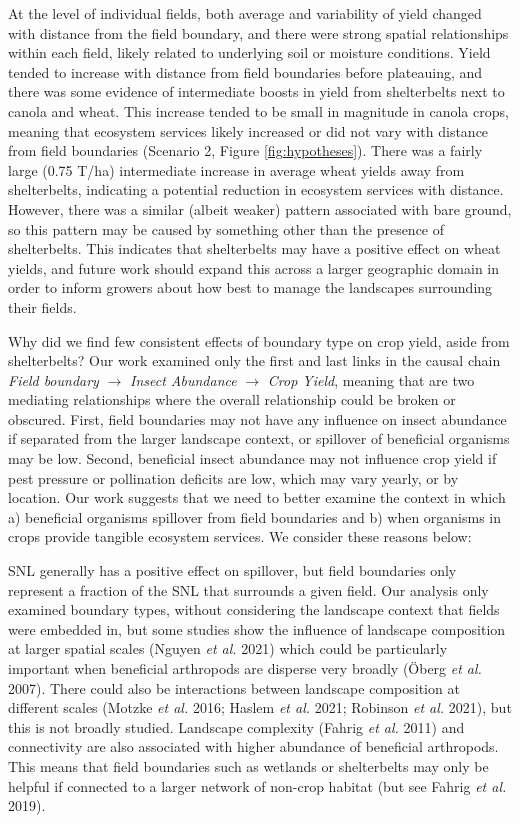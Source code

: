 \documentclass[]{elsarticle} %
\begin{document}
At the level of individual fields, both average and variability of yield changed with distance from the field boundary, and there were strong spatial relationships within each field, likely related to underlying soil or moisture conditions.
Yield tended to increase with distance from field boundaries before plateauing, and there was some evidence of intermediate boosts in yield from shelterbelts next to canola and wheat.
This increase tended to be small in magnitude in canola crops, meaning that ecosystem services likely increased or did not vary with distance from field boundaries (Scenario 2, Figure \ref{fig:hypotheses}).
There was a fairly large (0.75 T/ha) intermediate increase in average wheat yields away from shelterbelts, indicating a potential reduction in ecosystem services with distance.
However, there was a similar (albeit weaker) pattern associated with bare ground, so this pattern may be caused by something other than the presence of shelterbelts.
This indicates that shelterbelts may have a positive effect on wheat yields, and future work should expand this across a larger geographic domain in order to inform growers about how best to manage the landscapes surrounding their fields.

Why did we find few consistent effects of boundary type on crop yield, aside from shelterbelts?
Our work examined only the first and last links in the causal chain \emph{Field boundary} \(\rightarrow\) \emph{Insect Abundance} \(\rightarrow\) \emph{Crop Yield}, meaning that are two mediating relationships where the overall relationship could be broken or obscured.
First, field boundaries may not have any influence on insect abundance if separated from the larger landscape context, or spillover of beneficial organisms may be low.
Second, beneficial insect abundance may not influence crop yield if pest pressure or pollination deficits are low, which may vary yearly, or by location.
Our work suggests that we need to better examine the context in which a) beneficial organisms spillover from field boundaries and b) when organisms in crops provide tangible ecosystem services.
We consider these reasons below:

SNL generally has a positive effect on spillover, but field boundaries only represent a fraction of the SNL that surrounds a given field.
Our analysis only examined boundary types, without considering the landscape context that fields were embedded in, but some studies show the influence of landscape composition at larger spatial scales (Nguyen \emph{et al.} 2021) which could be particularly important when beneficial arthropods are disperse very broadly (Öberg \emph{et al.} 2007).
There could also be interactions between landscape composition at different scales (Motzke \emph{et al.} 2016; Haslem \emph{et al.} 2021; Robinson \emph{et al.} 2021), but this is not broadly studied.
Landscape complexity (Fahrig \emph{et al.} 2011) and connectivity are also associated with higher abundance of beneficial arthropods.
This means that field boundaries such as wetlands or shelterbelts may only be helpful if connected to a larger network of non-crop habitat (but see Fahrig \emph{et al.} 2019).
\end{document}

